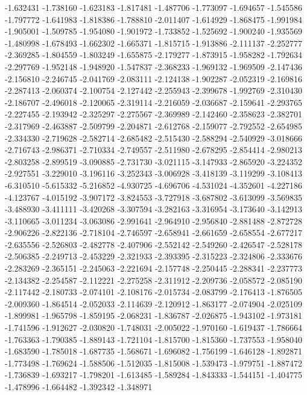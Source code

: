 -1.632431
-1.738160
-1.623183
-1.817481
-1.487706
-1.773097
-1.694657
-1.545586
-1.797772
-1.641983
-1.818386
-1.788810
-2.011407
-1.614929
-1.868475
-1.991984
-1.905001
-1.509785
-1.954080
-1.901972
-1.733852
-1.525692
-1.900240
-1.935569
-1.480998
-1.678493
-1.662302
-1.665371
-1.815715
-1.913886
-2.111137
-2.252777
-2.369285
-1.804559
-1.803249
-1.655875
-2.179277
-1.873915
-1.958282
-1.792634
-2.297769
-1.952148
-1.948920
-1.547837
-2.368233
-1.969132
-1.969509
-2.147436
-2.156810
-2.246745
-2.041769
-2.083111
-2.124138
-1.902287
-2.052319
-2.169816
-2.287413
-2.060374
-2.100754
-2.127442
-2.255943
-2.399678
-1.992769
-2.310430
-2.186707
-2.496018
-2.120065
-2.319114
-2.216059
-2.036687
-2.159641
-2.293765
-2.227455
-2.193942
-2.325297
-2.275567
-2.369989
-2.142460
-2.358623
-2.382701
-2.317969
-2.463887
-2.509799
-2.204871
-2.612768
-2.159077
-2.792552
-2.654985
-2.334330
-2.719628
-2.582714
-2.685482
-2.515430
-2.588294
-2.540929
-3.018666
-2.716743
-2.986371
-2.710334
-2.749557
-2.511980
-2.678295
-2.854414
-2.980213
-2.803258
-2.899519
-3.090885
-2.731730
-3.021115
-3.147933
-2.865920
-3.224352
-2.927551
-3.229010
-3.196116
-3.252343
-3.006928
-3.418139
-3.119299
-3.108413
-6.310510
-5.615332
-5.216852
-4.930725
-4.696706
-4.531024
-4.352601
-4.227186
-4.123767
-4.015192
-3.907172
-3.824553
-3.727918
-3.687802
-3.613099
-3.569835
-3.488930
-3.411111
-3.420268
-3.307594
-3.282163
-3.316954
-3.173640
-3.142913
-3.110665
-3.011234
-3.063086
-2.991641
-2.964910
-2.956840
-2.881488
-2.872728
-2.906226
-2.822136
-2.718104
-2.746597
-2.658941
-2.661659
-2.658554
-2.677217
-2.635556
-2.526803
-2.482778
-2.407906
-2.552142
-2.549260
-2.426547
-2.528178
-2.506385
-2.249713
-2.453229
-2.321933
-2.393395
-2.315223
-2.324806
-2.333676
-2.283269
-2.365151
-2.245063
-2.221694
-2.157748
-2.250445
-2.288341
-2.237773
-2.134382
-2.254587
-2.112221
-2.275258
-2.311912
-2.209736
-2.058572
-2.085190
-2.117442
-2.180733
-2.074101
-2.108176
-2.015734
-2.083799
-2.176413
-1.876505
-2.009360
-1.864514
-2.052033
-2.114639
-2.120912
-1.863177
-2.074904
-2.025109
-1.899981
-1.965798
-1.859195
-2.068231
-1.836787
-2.026875
-1.943102
-1.973181
-1.741596
-1.912627
-2.030820
-1.748031
-2.005022
-1.970160
-1.619437
-1.786664
-1.763363
-1.790385
-1.889143
-1.721104
-1.815700
-1.815360
-1.737553
-1.958040
-1.683590
-1.785018
-1.687735
-1.568671
-1.696082
-1.756199
-1.646128
-1.892871
-1.773498
-1.769624
-1.588506
-1.512035
-1.815008
-1.539473
-1.979751
-1.887472
-1.736839
-1.693217
-1.798201
-1.613485
-1.589284
-1.843333
-1.544151
-1.404775
-1.478996
-1.664482
-1.392342
-1.348971
